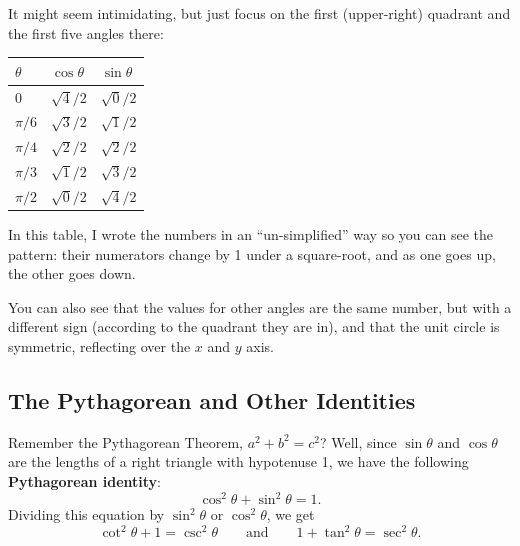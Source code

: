 It might seem intimidating, but just focus on the first (upper-right) quadrant and the first five angles there:


\begin{center}
\renewcommand{\arraystretch}{1.3}
\begin{tabular}{@{}lll@{}}
\toprule[0.4mm]
$\theta$ & $\cos\theta$ & $\sin\theta$ \\\midrule
   $0$  & $\sqrt{4}/2$ & $\sqrt{0}/2$ \\
$\pi/6$ & $\sqrt{3}/2$ & $\sqrt{1}/2$ \\
$\pi/4$ & $\sqrt{2}/2$ & $\sqrt{2}/2$ \\
$\pi/3$ & $\sqrt{1}/2$ & $\sqrt{3}/2$ \\
$\pi/2$ & $\sqrt{0}/2$ & $\sqrt{4}/2$ \\\bottomrule[0.4mm]
\end{tabular}
\end{center}

In this table, I wrote the numbers in an ``un-simplified'' way so you can see the pattern: their numerators change by 1 under a square-root, and as one goes up, the other goes down.

You can also see that the values for other angles are the same number, but with a different sign (according to the quadrant they are in), and that the unit circle is symmetric, reflecting over the $x$ and $y$ axis.

\subsection{The Pythagorean and Other Identities}

Remember the Pythagorean Theorem, $a^2 + b^2 = c^2$? Well, since $\sin\theta$ and $\cos\theta$ are the lengths of a right triangle with hypotenuse 1, we have the following \textbf{Pythagorean identity}:
$$\cos^2\theta +\sin^2\theta = 1.$$
Dividing this equation by $\sin^2\theta$ or $\cos^2\theta$, we get
$$\cot^2\theta + 1 = \csc^2\theta\quad\quad\text{and}\quad\quad 1+\tan^2\theta = \sec^2\theta.$$

